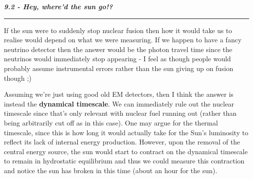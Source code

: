 \documentclass[12pt, letterpaper, twoside]{article}
\newcommand{\question}[1]{{\noindent \it #1}}
\newcommand{\answer}[1]{
    \par\noindent\rule{\textwidth}{0.4pt}#1\vspace{0.5cm}
}
\begin{document}
\question{\textbf{9.2 - Hey, where'd the sun go!?}}
\answer{
    If the sun were to suddenly stop nuclear fusion then how it would take us to realise would depend on what we were measuring. If we happen to have a fancy neutrino detector then the answer would be the photon travel time since the neutrinos would immediately stop appearing - I feel as though people would probably assume instrumental errors rather than the sun giving up on fusion though ;)

    Assuming we're just using good old EM detectors, then I think the answer is instead the \textbf{dynamical timescale}. We can immediately rule out the nuclear timescale since that's only relevant with nuclear fuel running out (rather than being arbitrarily cut off as in this case). One may argue for the thermal timescale, since this is how long it would actually take for the Sun's luminosity to reflect its lack of internal energy production. However, upon the removal of the central energy source, the sun would start to contract on the dynamical timescale to remain in hydrostatic equilibrium and thus we could measure this contraction and notice the sun has broken in this time (about an hour for the sun).
}
\end{document}

